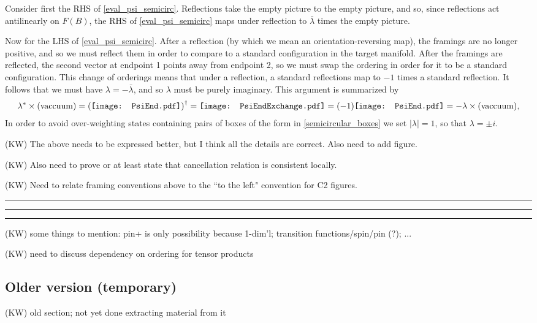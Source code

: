 \documentclass[12pt,a4paper]{article}
\newcommand{\kw}[1]{{\color{kwcolor}\footnotesize{(KW) #1}}}
\newcommand{\kwsep}{\bigskip\hrule\medskip\hrule\medskip\hrule\bigskip}
\newcommand{\PsiEnd}{\mathord{\vcenter{\hbox{\texttt{[image: PsiEnd.pdf]}}}}}
\newcommand{\PsiEndExchange}{\mathord{\vcenter{\hbox{\texttt{[image: PsiEndExchange.pdf]}}}}}
\begin{document}
Consider first the RHS of \eqref{eval_psi_semicirc}. 
Reflections take the empty picture to the empty picture, and so, since reflections act antilinearly on $F(B)$,
the RHS of \eqref{eval_psi_semicirc} maps under reflection to $\bar\lambda$ times the empty picture.

Now for the LHS of \eqref{eval_psi_semicirc}.
After a reflection (by which we mean an orientation-reversing map), 
the framings are no longer positive, and so we must reflect them in order to compare to a standard configuration
in the target manifold.
After the framings are reflected, the second vector at endpoint 1  points away from endpoint 2,
so we must swap the ordering in order for it to be a standard configuration.
This change of orderings means that under a reflection, a standard reflections map to $-1$ times a standard
reflection.
It follows that we must have $\lambda = -\bar\lambda$, and so $\lambda$ must be purely imaginary.
This argument is summarized by 
\begin{align}
\lambda^{*} \times ({\rm vaccuum}) = \left( \PsiEnd \right) ^{\dagger}  = \PsiEndExchange = (-1) \PsiEnd  = - \lambda \times ({\rm vaccuum}),
\label{phase}
\end{align}
In order to avoid over-weighting states containing pairs of boxes 
of the form in \eqref{semicircular_boxes} we set 
$|\lambda|=1$, so that $\lambda = \pm i$. 


\kw{The above needs to be expressed better, but I think all the details are correct.
Also need to add figure.}

\kw{Also need to prove or at least state that cancellation relation is consistent locally.}

\kw{Need to relate framing conventions above to the ``to the left" convention for C2 figures.}

\kwsep


\kw{some things to mention: pin+ is only possibility because 1-dim'l; transition functions/spin/pin (?); ...}

\kw{need to discuss dependency on ordering for tensor products}



\subsection{Older version (temporary)}

\kw{old section; not yet done extracting material from it}
\end{document}
